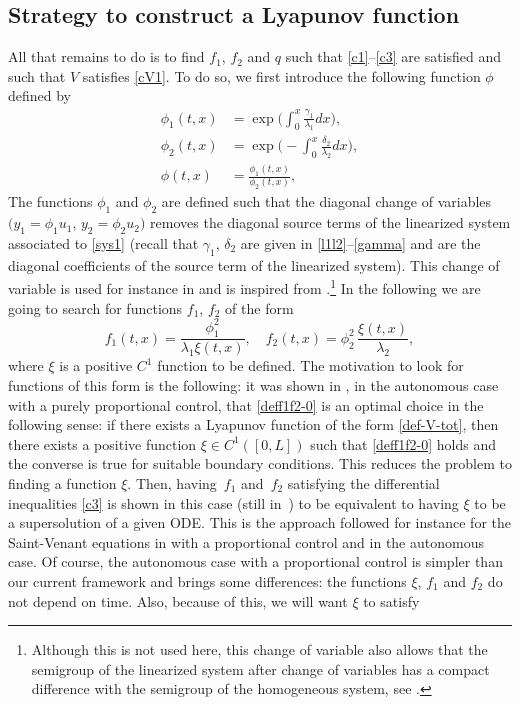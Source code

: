 \documentclass[JEP,XML,SOM,Unicode]{cedram}
\theoremstyle{definition}
\begin{document}
\subsection{Strategy to construct a Lyapunov function}
{A}ll that remains to do is to find $f_{1}$, $f_{2}$ and $q$ such that \eqref{c1}--\eqref{c3} are satisfied and such that $V$ satisfies \eqref{cV1}.
{To do so, we} first introduce the following function $\phi$ defined by
\begin{equation}
\begin{split}
\phi_{1}(t,x)&=\exp\biggl(\int_{0}^{x}\frac{\gamma_{1}}{\lambda_{1}}dx\biggr),\\
\phi_{2}(t,x)&=\exp\biggl(-\int_{0}^{x}\frac{\delta_{2}}{\lambda_{2}}dx\biggr),\\
\phi(t,x)&=\frac{\phi_{1}(t,x)}{\phi_{2}(t,x)},
\end{split}
\label{phi}
\end{equation}
The functions $\phi_{1}$ and $\phi_{2}$ are defined such that the diagonal change of variables $(y_{1} = \phi_{1}u_{1}$, $y_{2}= \phi_{2}u_{2})$ removes the diagonal source terms of the linearized system associated to \eqref{sys1} (recall that $\gamma_{1}$, $\delta_{2}$ are given in \eqref{l1l2}--\eqref{gamma} and are the diagonal coefficients of the source term of the linearized system). This change of variable is used for instance in \cite{BastinCoron22,C1_22} and is inspired from \cite[Chap.\,9]{KrsticBook}.\footnote{Although this is not used here, this change of variable also allows that the semigroup of the linearized system after change of variables has a compact difference with the semigroup of the homogeneous system, see \cite{hu2021minimal}.} In the following we are going to search for functions $f_{1}$, $f_{2}$ of the form
\begin{equation}
f_{1}(t,x)=\frac{\phi^{2}_{1}}{\lambda_{1}\xi(t,x)},\quad f_{2}(t,x)=\phi_{2}^{2}\,\frac{\xi(t,x)}{\lambda_{2}},
\label{deff1f2-0}
\end{equation}
where $\xi$ is a positive $C^{1}$ function to be defined. The motivation to look for functions of this form is the following: it was shown in \cite{BastinCoron22}, in the autonomous case with a purely proportional control, that \eqref{deff1f2-0} is an optimal choice in the following sense: if there exists a Lyapunov function of the form \eqref{def-V-tot}, then there exists a positive function $\xi\in C^{1}([0,L])$ such that \eqref{deff1f2-0} holds and the converse is true for suitable boundary conditions. This reduces the problem to finding a function $\xi$. Then, having~$f_{1}$ and~$f_{2}$ satisfying the differential inequalities \eqref{c3} is shown in this case (still in~\cite{BastinCoron22}) to be equivalent to having $\xi$ to be a supersolution of a given ODE. This is the approach followed for instance for the Saint-Venant equations in \cite{BC2017,HS} with a proportional control and in the autonomous case. Of course, the autonomous case with a proportional control is simpler than our current framework and brings some differences: the functions $\xi$, $f_{1}$ and $f_{2}$ do not depend on time. Also, because of this, we will want $\xi$ to satisfy
\end{document}

